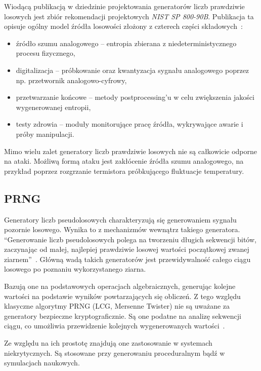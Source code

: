 Wiodącą publikacją w dziedzinie projektowania generatorów liczb prawdziwie 
losowych jest zbiór rekomendacji projektowych \textit{NIST SP 800-90B}. 
Publikacja ta opisuje ogólny model źródła losowości złożony z czterech 
części składowych~\cite{NIST-SP-800-90B}:

\begin{itemize}
    \item źródło szumu analogowego -- entropia zbierana z niedeterministycznego 
    procesu fizycznego,
    \item digitalizacja -- próbkowanie oraz kwantyzacja sygnału analogowego 
    poprzez np. przetwornik analogowo-cyfrowy,
    \item przetwarzanie końcowe -- metody postprocessing'u w celu zwiększenia 
    jakości wygenerowanej entropii, 
    \item testy zdrowia -- moduły monitorujące pracę źródła, wykrywające awarie i 
    próby manipulacji.
\end{itemize}

Mimo wielu zalet generatory liczb prawdziwie losowych nie są całkowicie 
odporne na ataki. Możliwą formą ataku jest zakłócenie źródła szumu analogowego, 
na przykład poprzez rozgrzanie termistora próbkującego fluktuacje temperatury.

\subsection{PRNG}

\noindent Generatory liczb pseudolosowych charakteryzują się generowaniem sygnału 
pozornie losowego. Wynika to z mechanizmów wewnątrz takiego generatora. 
\enquote{Generowanie liczb pseudolosowych polega na tworzeniu długich sekwencji 
bitów, zaczynając od małej, najlepiej prawdziwie losowej wartości początkowej 
zwanej ziarnem}~\cite{2023anstasios-panagiotis-georgis-yannis}. Główną wadą 
takich generatorów jest przewidywalność całego ciągu losowego po poznaniu 
wykorzystanego ziarna. 

Bazują one na podstawowych operacjach algebraicznych, generując kolejne 
wartości na podstawie wyników powtarzających się obliczeń. Z tego względu 
klasyczne algorytmy PRNG (LCG, Mersenne Twister) nie są uważane za generatory 
bezpieczne kryptograficznie. Są one podatne na analizę sekwencji ciągu, co 
umożliwia przewidzenie kolejnych wygenerowanych 
wartości~\cite{2024-predicting-prngs}.

Ze względu na ich prostotę znajdują one zastosowanie w systemach niekrytycznych. 
Są stosowane przy generowaniu proceduralnym bądź w symulacjach naukowych.

